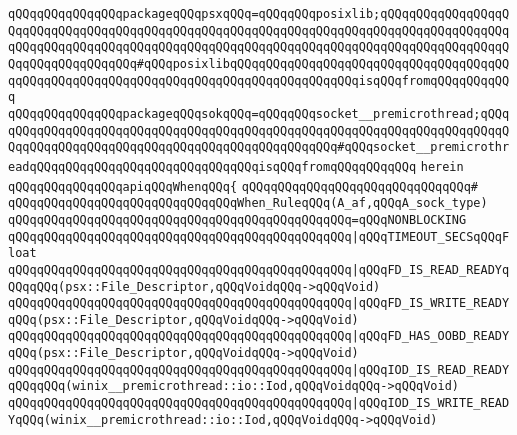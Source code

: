 \verb|qQQqqQQqqQQqqQQqpackageqQQqpsxqQQq=qQQqqQQqposixlib;qQQqqQQqqQQqqQQqqQQqqQQqqQQqqQQqqQQqqQQqqQQqqQQqqQQqqQQqqQQqqQQqqQQqqQQqqQQqqQQqqQQqqQQqqQQqqQQqqQQqqQQqqQQqqQQqqQQqqQQqqQQqqQQqqQQqqQQqqQQqqQQqqQQqqQQqqQQqqQQqqQQqqQQqqQQqqQQq#qQQqposixlibqQQqqQQqqQQqqQQqqQQqqQQqqQQqqQQqqQQqqQQqqQQqqQQqqQQqqQQqqQQqqQQqqQQqqQQqqQQqqQQqqQQqqQQqisqQQqfromqQQqqQQqqQQq|\newline
\verb|qQQqqQQqqQQqqQQqpackageqQQqsokqQQq=qQQqqQQqsocket__premicrothread;qQQqqQQqqQQqqQQqqQQqqQQqqQQqqQQqqQQqqQQqqQQqqQQqqQQqqQQqqQQqqQQqqQQqqQQqqQQqqQQqqQQqqQQqqQQqqQQqqQQqqQQqqQQqqQQqqQQqqQQq#qQQqsocket__premicrothreadqQQqqQQqqQQqqQQqqQQqqQQqqQQqqQQqisqQQqfromqQQqqQQqqQQq|\newline
\verb|herein|\newline
\newline
\verb|qQQqqQQqqQQqqQQqapiqQQqWhenqQQq{|\newline
\verb|qQQqqQQqqQQqqQQqqQQqqQQqqQQqqQQq#|\newline
\verb|qQQqqQQqqQQqqQQqqQQqqQQqqQQqqQQqWhen_RuleqQQq(A_af,qQQqA_sock_type)|\newline
\verb|qQQqqQQqqQQqqQQqqQQqqQQqqQQqqQQqqQQqqQQqqQQqqQQq=qQQqNONBLOCKING|\newline
\verb|qQQqqQQqqQQqqQQqqQQqqQQqqQQqqQQqqQQqqQQqqQQqqQQq|\verb#|qQQqTIMEOUT_SECSqQQqFloat#\newline
\newline
\verb|qQQqqQQqqQQqqQQqqQQqqQQqqQQqqQQqqQQqqQQqqQQqqQQq|\verb#|qQQqFD_IS_READ_READYqQQqqQQq(psx::File_Descriptor,qQQqVoidqQQq->qQQqVoid)#\newline
\verb|qQQqqQQqqQQqqQQqqQQqqQQqqQQqqQQqqQQqqQQqqQQqqQQq|\verb#|qQQqFD_IS_WRITE_READYqQQq(psx::File_Descriptor,qQQqVoidqQQq->qQQqVoid)#\newline
\verb|qQQqqQQqqQQqqQQqqQQqqQQqqQQqqQQqqQQqqQQqqQQqqQQq|\verb#|qQQqFD_HAS_OOBD_READYqQQq(psx::File_Descriptor,qQQqVoidqQQq->qQQqVoid)#\newline
\newline
\verb|qQQqqQQqqQQqqQQqqQQqqQQqqQQqqQQqqQQqqQQqqQQqqQQq|\verb#|qQQqIOD_IS_READ_READYqQQqqQQq(winix__premicrothread::io::Iod,qQQqVoidqQQq->qQQqVoid)#\newline
\verb|qQQqqQQqqQQqqQQqqQQqqQQqqQQqqQQqqQQqqQQqqQQqqQQq|\verb#|qQQqIOD_IS_WRITE_READYqQQq(winix__premicrothread::io::Iod,qQQqVoidqQQq->qQQqVoid)#\newline
